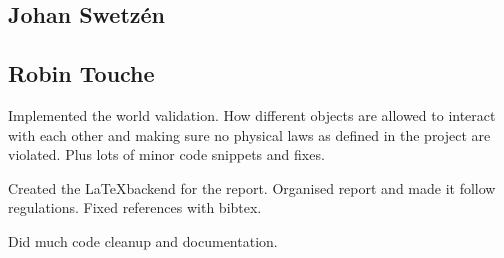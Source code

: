\subsection*{Johan Swetz\'en}
\subsection*{Robin Touche}
Implemented the world validation.
How different objects are allowed to interact with each other and making sure no physical laws as defined in the project are violated.
Plus lots of minor code snippets and fixes.

Created the \LaTeX  backend for the report.
Organised report and made it follow regulations.
Fixed references with bibtex.

Did much code cleanup and documentation.
